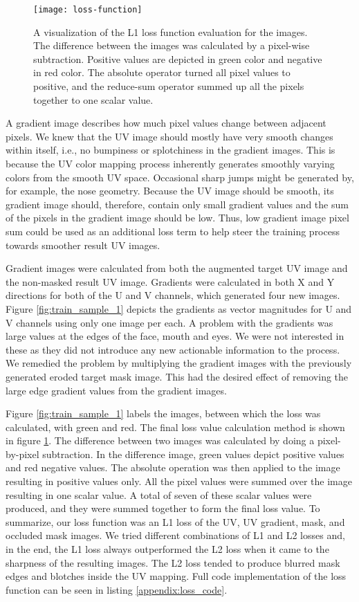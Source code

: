 \begin{figure}
    \centerline{\texttt{[image: loss-function]}}
    \caption[Loss function]{A visualization of the L1 loss function evaluation for the images. The difference between the images was calculated by a pixel-wise subtraction. Positive values are depicted in green color and negative in red color. The absolute operator turned all pixel values to positive, and the reduce-sum operator summed up all the pixels together to one scalar value.}
    \label{fig:loss_function_1}
\end{figure}

A gradient image describes how much pixel values change between adjacent pixels. We knew that the UV image should mostly have very smooth changes within itself, i.e., no bumpiness or splotchiness in the gradient images. This is because the UV color mapping process inherently generates smoothly varying colors from the smooth UV space. Occasional sharp jumps might be generated by, for example, the nose geometry. Because the UV image should be smooth, its gradient image should, therefore, contain only small gradient values and the sum of the pixels in the gradient image should be low. Thus, low gradient image pixel sum could be used as an additional loss term to help steer the training process towards smoother result UV images.

Gradient images were calculated from both the augmented target UV image and the non-masked result UV image. Gradients were calculated in both X and Y directions for both of the U and V channels, which generated four new images. Figure \ref{fig:train_sample_1} depicts the gradients as vector magnitudes for U and V channels using only one image per each. A problem with the gradients was large values at the edges of the face, mouth and eyes. We were not interested in these as they did not introduce any new actionable information to the process. We remedied the problem by multiplying the gradient images with the previously generated eroded target mask image. This had the desired effect of removing the large edge gradient values from the gradient images.

Figure \ref{fig:train_sample_1} labels the images, between which the loss was calculated, with green and red. The final loss value calculation method is shown in figure \ref{fig:loss_function_1}. The difference between two images was calculated by doing a pixel-by-pixel subtraction. In the difference image, green values depict positive values and red negative values. The absolute operation was then applied to the image resulting in positive values only. All the pixel values were summed over the image resulting in one scalar value. A total of seven of these scalar values were produced, and they were summed together to form the final loss value. To summarize, our loss function was an L1 loss of the UV, UV gradient, mask, and occluded mask images. We tried different combinations of L1 and L2 losses and, in the end, the L1 loss always outperformed the L2 loss when it came to the sharpness of the resulting images. The L2 loss tended to produce blurred mask edges and blotches inside the UV mapping. Full code implementation of the loss function can be seen in listing \ref{appendix:loss_code}.

